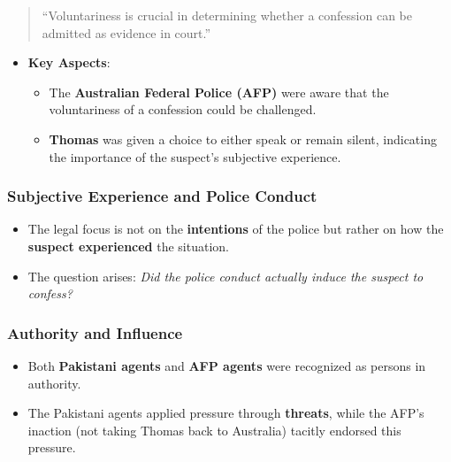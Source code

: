 \begin{quote}
``Voluntariness is crucial in determining whether a confession can be
admitted as evidence in court.''
\end{quote}

\begin{itemize}
\tightlist
\item
  \textbf{Key Aspects}:

  \begin{itemize}
  \tightlist
  \item
    The \textbf{Australian Federal Police (AFP)} were aware that the
    voluntariness of a confession could be challenged.
  \item
    \textbf{Thomas} was given a choice to either speak or remain silent,
    indicating the importance of the suspect's subjective experience.
  \end{itemize}
\end{itemize}

\subsubsection{Subjective Experience and Police
Conduct}\label{subjective-experience-and-police-conduct}

\begin{itemize}
\tightlist
\item
  The legal focus is not on the \textbf{intentions} of the police but
  rather on how the \textbf{suspect experienced} the situation.
\item
  The question arises: \emph{Did the police conduct actually induce the
  suspect to confess?}
\end{itemize}

\subsubsection{Authority and Influence}\label{authority-and-influence}

\begin{itemize}
\tightlist
\item
  Both \textbf{Pakistani agents} and \textbf{AFP agents} were recognized
  as persons in authority.
\item
  The Pakistani agents applied pressure through \textbf{threats}, while
  the AFP's inaction (not taking Thomas back to Australia) tacitly
  endorsed this pressure.
\end{itemize}

